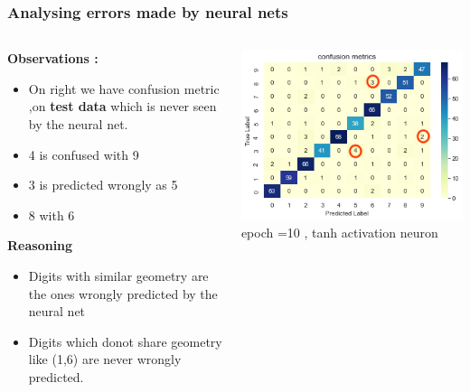 \documentclass[12pt,t]{beamer}
\begin{document}
\begin{frame}
    \frametitle{Analysing errors made by neural nets}
    \scriptsize

    \begin{columns}
        \begin{column}[T]{0.4\linewidth}
            \textbf{Observations :}
            \begin{itemize}
                \item On right we have confusion metric ,on \textbf{test data}
                    which is never seen by the neural net.
                \item 4 is confused with 9
                \item 3 is predicted wrongly as 5 
                \item 8 with 6
                
            \end{itemize}

            \textbf{Reasoning}
            \begin{itemize}
                \item Digits with similar geometry are the ones wrongly predicted by the neural net
                \item Digits which donot share geometry like (1,6) are never wrongly predicted.
            \end{itemize}
        \end{column}
        \begin{column}[T]{0.7\linewidth}
            \includegraphics[width=\linewidth]{tanh/confusion_metrics.png}
            \centering epoch =10 , tanh activation neuron 
        \end{column}
    \end{columns}
    

\end{frame}
\end{document}
